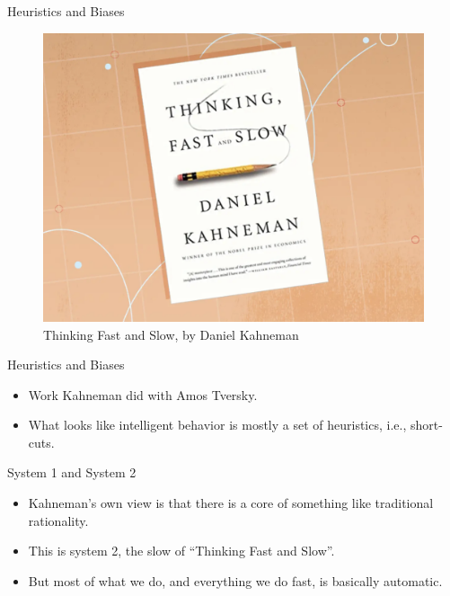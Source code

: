 \documentclass[
  17pt,
  letterpaper,
  ignorenonframetext,
  aspectratio=169,
  handout]{beamer}
\providecommand{\tightlist}{%
  \setlength{\itemsep}{0pt}\setlength{\parskip}{0pt}}\usepackage{longtable,booktabs,array}
\begin{document}
\begin{frame}{Heuristics and Biases}
\protect\hypertarget{heuristics-and-biases}{}
\begin{figure}

{\centering \includegraphics[width=\textwidth,height=0.6\textheight]{../images/kahneman.png}

}

\caption{Thinking Fast and Slow, by Daniel Kahneman}

\end{figure}
\end{frame}

\begin{frame}{Heuristics and Biases}
\protect\hypertarget{heuristics-and-biases-1}{}
\begin{itemize}[<+->]
\tightlist
\item
  Work Kahneman did with Amos Tversky.
\item
  What looks like intelligent behavior is mostly a set of heuristics,
  i.e., short-cuts.
\end{itemize}
\end{frame}

\begin{frame}{System 1 and System 2}
\protect\hypertarget{system-1-and-system-2}{}
\begin{itemize}[<+->]
\tightlist
\item
  Kahneman's own view is that there is a core of something like
  traditional rationality.
\item
  This is system 2, the slow of ``Thinking Fast and Slow''.
\item
  But most of what we do, and everything we do fast, is basically
  automatic.
\end{itemize}
\end{frame}
\end{document}
